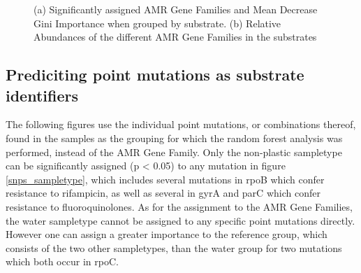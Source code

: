 \begin{figure}[!h]
    \centering
    \caption{(a) Significantly assigned AMR Gene Families and Mean Decrease Gini Importance when grouped by substrate. (b) Relative Abundances of the different AMR Gene Families in the substrates}
    \label{amr_substrate}
\end{figure}

\subsection{Prediciting point mutations as substrate identifiers}   
The following figures use the individual point mutations, or combinations thereof, found in the samples as the grouping for which the random forest analysis was performed, instead of the AMR Gene Family. 
Only the non-plastic sampletype can be significantly assigned (p < 0.05) to any mutation in figure \ref{snps_sampletype}, which includes several mutations in rpoB which confer resistance to rifampicin, as well as several in gyrA and parC which confer resistance to fluoroquinolones. 
As for the assignment to the AMR Gene Families, the water sampletype cannot be assigned to any specific point mutations directly. However one can assign a greater importance to the reference group, which consists of the two other sampletypes, than the water group for two mutations which both occur in rpoC.

